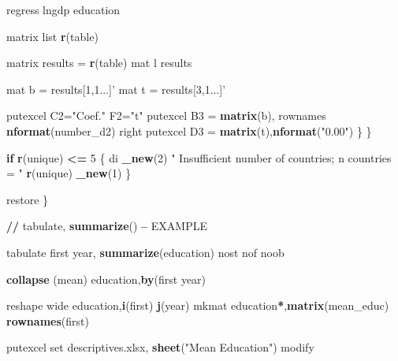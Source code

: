 \documentclass[
  12pt,
]{article}
\newenvironment{Shaded}{\begin{snugshade}}{\end{snugshade}}
\newcommand{\ControlFlowTok}[1]{\textcolor[rgb]{0.13,0.29,0.53}{\textbf{#1}}}
\newcommand{\DecValTok}[1]{\textcolor[rgb]{0.00,0.00,0.81}{#1}}
\newcommand{\ErrorTok}[1]{\textcolor[rgb]{0.64,0.00,0.00}{\textbf{#1}}}
\newcommand{\KeywordTok}[1]{\textcolor[rgb]{0.13,0.29,0.53}{\textbf{#1}}}
\newcommand{\NormalTok}[1]{#1}
\newcommand{\OperatorTok}[1]{\textcolor[rgb]{0.81,0.36,0.00}{\textbf{#1}}}
\newcommand{\StringTok}[1]{\textcolor[rgb]{0.31,0.60,0.02}{#1}}
\begin{document}
\begin{Shaded}
\begin{Highlighting}[]
{\NormalTok{                    regress lngdp education}
                        
\NormalTok{                            matrix list }\KeywordTok{r}\NormalTok{(table)}
                        
\NormalTok{                        matrix results =}\StringTok{ }\KeywordTok{r}\NormalTok{(table)}
\NormalTok{                            mat l results}
                        
\NormalTok{                        mat b =}\StringTok{ }\NormalTok{results[}\DecValTok{1}\NormalTok{,}\DecValTok{1}\NormalTok{...]}\StringTok{'}
\StringTok{                        mat t = results[3,1...]'}
                        
\NormalTok{                        putexcel C2=}\StringTok{"Coef."}\NormalTok{ F2=}\StringTok{"t"}
\NormalTok{                        putexcel B3 =}\StringTok{ }\KeywordTok{matrix}\NormalTok{(b), rownames }\KeywordTok{nformat}\NormalTok{(number_d2) right}
\NormalTok{                        putexcel D3 =}\StringTok{ }\KeywordTok{matrix}\NormalTok{(t),}\KeywordTok{nformat}\NormalTok{(}\StringTok{"0.00"}\NormalTok{)}
\NormalTok{                \}}
\NormalTok{            \}}
            
            \ControlFlowTok{if} \KeywordTok{r}\NormalTok{(unique) }\OperatorTok{<=}\StringTok{ }\DecValTok{5}\NormalTok{ \{}
\NormalTok{                di }\KeywordTok{_new}\NormalTok{(}\DecValTok{2}\NormalTok{) }\StringTok{"    Insufficient number of countries; n countries = "} \KeywordTok{r}\NormalTok{(unique) }\KeywordTok{_new}\NormalTok{(}\DecValTok{1}\NormalTok{)}
\NormalTok{            \}}
            
\NormalTok{        restore}
\NormalTok{\}}

\OperatorTok{/}\ErrorTok{/}\StringTok{ }\NormalTok{tabulate, }\KeywordTok{summarize}\NormalTok{() }\OperatorTok{--}\StringTok{ }\NormalTok{EXAMPLE}

\NormalTok{tabulate first year, }\KeywordTok{summarize}\NormalTok{(education) nost nof noob}

\KeywordTok{collapse}\NormalTok{ (mean) education,}\KeywordTok{by}\NormalTok{(first year)}

\NormalTok{reshape wide education,}\KeywordTok{i}\NormalTok{(first) }\KeywordTok{j}\NormalTok{(year)}
\NormalTok{mkmat education}\OperatorTok{*}\NormalTok{,}\KeywordTok{matrix}\NormalTok{(mean_educ) }\KeywordTok{rownames}\NormalTok{(first)}

\NormalTok{putexcel set descriptives.xlsx, }\KeywordTok{sheet}\NormalTok{(}\StringTok{"Mean Education"}\NormalTok{) modify}

}
\end{Highlighting}
\end{Shaded}
\end{document}
